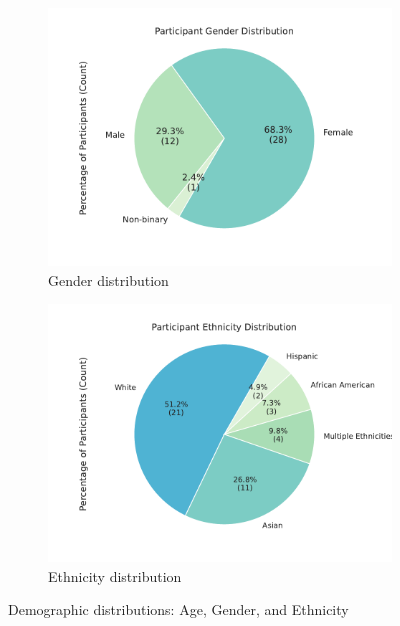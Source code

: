 \begin{figure}[ht]
    \begin{subfigure}[b]{0.45\textwidth}
        \centering
        \includegraphics[width=\textwidth]{content/image/demo/demo_gender.pdf}
        \caption{Gender distribution}
        \label{fig:demoGender}
    \end{subfigure}
    \hfill
    \begin{subfigure}[b]{0.45\textwidth}
        \centering
        \includegraphics[width=\textwidth]{content/image/demo/demo_ethnicity.pdf}
        \caption{Ethnicity distribution}
        \label{fig:demoEthnicity}
    \end{subfigure}
    
    \caption{Demographic distributions: Age, Gender, and Ethnicity}
    \label{fig:Demographics}
\end{figure}

